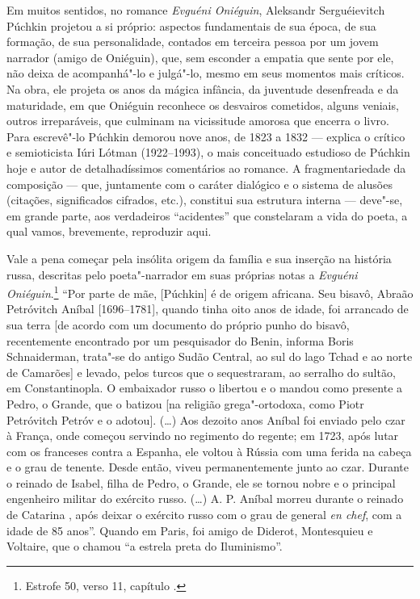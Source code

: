 Em muitos sentidos, no romance \emph{Evguéni Oniéguin},
Aleksandr Serguéievitch Púchkin
projetou a si próprio: aspectos fundamentais de sua época, de sua
formação, de sua personalidade, contados em terceira pessoa por um jovem
narrador (amigo de Oniéguin), que, sem esconder a empatia que sente por
ele, não deixa de acompanhá"-lo e julgá"-lo, mesmo em seus momentos mais
críticos. Na obra, ele projeta os anos da mágica infância, da juventude
desenfreada e da maturidade, em que Oniéguin reconhece os desvairos
cometidos, alguns veniais, outros irreparáveis, que culminam na
vicissitude amorosa que encerra o livro. Para escrevê"-lo Púchkin demorou
nove anos, de 1823 a 1832 --- explica o crítico e semioticista Iúri
Lótman (1922--1993), o mais conceituado estudioso de
Púchkin hoje e autor de detalhadíssimos comentários ao romance. A
fragmentariedade da composição --- que, juntamente com o caráter dialógico e
o sistema de alusões (citações, significados cifrados, etc.), constitui
sua estrutura interna --- deve"-se, em grande parte, aos verdadeiros
``acidentes'' que constelaram a vida do poeta, a qual vamos, brevemente,
reproduzir aqui.

Vale a pena começar pela insólita origem da família e sua inserção na
história russa, descritas pelo poeta"-narrador em suas próprias notas a
\emph{Evguéni Oniéguin}.\footnote{Estrofe 50, verso 11, capítulo .} ``Por parte
de mãe, [Púchkin] é de origem africana. Seu bisavô, Abraão
Petróvitch Aníbal [1696--1781], quando tinha oito anos de idade, foi
arrancado de sua terra [de acordo com um documento do próprio punho
do bisavô, recentemente encontrado por um pesquisador do Benin, informa
Boris Schnaiderman, trata"-se do antigo Sudão Central, ao sul do lago
Tchad e ao norte de Camarões] e levado, pelos turcos que o
sequestraram, ao serralho do sultão, em Constantinopla. O embaixador
russo o libertou e o mandou como presente a Pedro, o Grande, que o batizou [na religião grega"-ortodoxa, como Piotr
Petróvitch Petróv e o adotou]. (\ldots{}) Aos dezoito anos Aníbal foi enviado pelo czar à França, onde começou servindo no regimento do
regente; em 1723, após lutar com os franceses contra a Espanha, ele
voltou à Rússia com uma ferida na cabeça e o grau de tenente.
Desde então, viveu permanentemente junto ao czar. Durante o
reinado de Isabel, filha de Pedro, o Grande, ele se tornou nobre e o
principal engenheiro militar do exército russo. (\ldots{}) A. P. Aníbal
morreu durante o reinado de Catarina , após deixar o
exército russo com o grau de general \emph{en chef}, com a idade de 85
anos''. Quando em Paris, foi amigo de Diderot, Montesquieu e Voltaire,
que o chamou ``a estrela preta do Iluminismo''.

